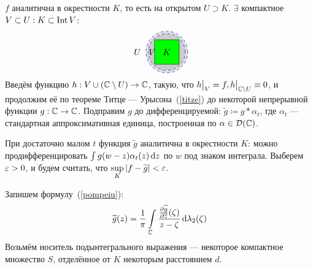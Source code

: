 \documentclass[a4paper]{report}
\begin{document}
{{{%
        }

    $f$ аналитична в окрестности $K$, то есть на открытом $U \supset K$.
    $\exists$ компактное $V \subset U: K \subset \operatorname{Int} V$:
        \[\begin{tikzpicture}
              \fill[light] (0.5, 0.5) circle (0.85);
              \fill[lightgray] (0.5, 0.5) circle (0.75);
              \draw[dashed] (0.5, 0.5) circle (0.75);
              \draw[dashed] (0.5, 0.5) circle (0.85);
              \fill[green] plot [tension=1] coordinates {(0,0) (0, 1) (1,1) (1,0)};
              \draw plot [tension=1] coordinates {(0,0) (0, 1) (1,1) (1,0) (0,0)};
              \node at(0.5, 0.5) {$K$};
              \node at(-0.1, 0.5) {$V$};
              \node at(-0.7, 0.5) {$U$};
        \end{tikzpicture}\]
    Введём функцию $h: V \cup (\mathbb{C} \setminus U) \rightarrow \mathbb{C}$, такую, что $h\big|_{V} = f, h\big|_{\mathbb{C} \setminus U} \equiv 0$, и продолжим её по теореме Титце --- Урысона~(\cref{titze}) до некоторой непрерывной функции $g: \mathbb{C} \rightarrow \mathbb{C}$.
    Подправим $g$ до дифференцируемой: $\tilde{g} \coloneqq g * \alpha_t$, где $\alpha_t$ --- стандартная аппроксимативная единица, построенная по $\alpha \in \mathcal{D}(\mathbb{C})$.

    При достаточно малом $t$ функция $\tilde{g}$ аналитична в окрестности $K$: можно продифференцировать $\int g(w - z)\alpha_t(z)\operatorname{d}\! z$ по $w$ под знаком интеграла.
    Выберем $\varepsilon > 0$, и будем считать, что $\sup\limits_{K}|f - \widetilde{g}| < \varepsilon$.

    Запишем формулу~(\cref{pompeiu}): \[\widetilde{g}(z) = \frac{1}{\pi}\int\limits_{\mathbb{C}}\frac{\frac{\partial \widetilde{g}}{\partial \overline{z}}(\zeta)}{z - \zeta}\operatorname{d}\!\lambda_2(\zeta)\]
    Возьмём носитель подынтегрального выражения --- некоторое компактное множество $S$, отделённое от $K$ некоторым расстоянием $d$.

}}
\end{document}

